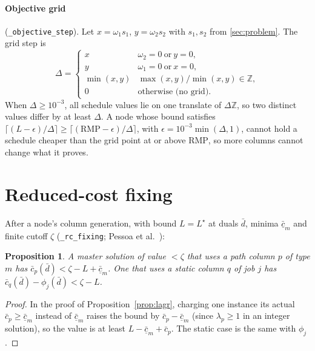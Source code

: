 \documentclass[11pt,a4paper]{article}
\newtheorem{proposition}[theorem]{Proposition}
\theoremstyle{definition}
\theoremstyle{remark}
\newcommand{\Z}{\mathbb{Z}}
\newcommand{\code}[1]{\texttt{#1}}
\newcommand{\rc}{\bar c}
\newcommand{\RMP}{\mathrm{RMP}}
\begin{document}
\paragraph{Objective grid} (\code{\_objective\_step}). Let $x=\omega_1s_1$,
$y=\omega_2s_2$ with $s_1,s_2$ from \cref{sec:problem}. The grid step is
\[
\Delta=\begin{cases}
x & \omega_2=0\ \text{or}\ y=0,\\
y & \omega_1=0\ \text{or}\ x=0,\\
\min(x,y) & \max(x,y)/\min(x,y)\in\Z,\\
0 & \text{otherwise (no grid)}.
\end{cases}
\]
When $\Delta\ge10^{-3}$, all schedule values lie on one translate of $\Delta\Z$,
so two distinct values differ by at least $\Delta$. A node whose bound
satisfies $\lceil(L-\epsilon)/\Delta\rceil\ge\lceil(\RMP-\epsilon)/\Delta\rceil$,
with $\epsilon=10^{-3}\min(\Delta,1)$, cannot hold a schedule cheaper than the
grid point at or above $\RMP$, so more columns cannot change what it proves.

\section{Reduced-cost fixing}\label{sec:fixing}

After a node's column generation, with bound $L=L^\star$ at duals $\bar d$,
minima $\underline{\rc}_m$ and finite cutoff $\zeta$ (\code{\_rc\_fixing};
Pessoa et al.~\cite{pessoa2010}):

\begin{proposition}\label{prop:fix}
A master solution of value $<\zeta$ that uses a path column $p$ of type $m$
has $\rc_p(\bar d)<\zeta-L+\underline{\rc}_m$. One that uses a static column
$q$ of job $j$ has $\rc_q(\bar d)-\phi_j(\bar d)<\zeta-L$.
\end{proposition}

\begin{proof}
In the proof of Proposition~\ref{prop:lagr}, charging one instance its actual
$\rc_p\ge\underline{\rc}_m$ instead of $\underline{\rc}_m$ raises the bound by
$\rc_p-\underline{\rc}_m$ (since $\lambda_p\ge1$ in an integer solution), so
the value is at least $L-\underline{\rc}_m+\rc_p$. The static case is the same
with $\phi_j$.
\end{proof}
\end{document}
